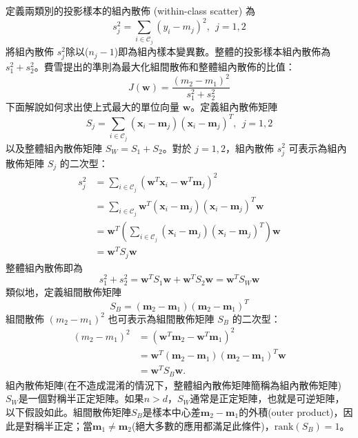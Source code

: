 定義兩類別的投影樣本的組內散佈 (within-class scatter) 為
$$\displaystyle  s_j^2=\sum_{i\in\mathcal{C}_j}(y_i-m_j)^2,~~j=1,2$$
將組內散佈 $s_j^2$除以($n_j-1$)即為組內樣本變異數。整體的投影樣本組內散佈為$s_1^2+s_2^2$。費雪提出的準則為最大化組間散佈和整體組內散佈的比值：
$$\displaystyle  J(\mathbf{w})=\frac{(m_2-m_1)^2}{s_1^2+s_2^2}$$
下面解說如何求出使上式最大的單位向量 $\mathbf{w}$。定義組內散佈矩陣
$$\displaystyle  S_j=\sum_{i\in\mathcal{C}_j}(\mathbf{x}_i-\mathbf{m}_j)(\mathbf{x}_i-\mathbf{m}_j)^T,~~j=1,2$$
以及整體組內散佈矩陣 $S_W=S_1+S_2$。對於 $j=1,2$，組內散佈 $s_j^2$ 可表示為組內散佈矩陣 $S_j$ 的二次型：
$$\displaystyle\begin{aligned}  s_j^2&=\sum_{i\in\mathcal{C}_j}\left(\mathbf{w}^T\mathbf{x}_i-\mathbf{w}^T\mathbf{m}_j\right)^2\\  &=\sum_{i\in\mathcal{C}_j}\mathbf{w}^T(\mathbf{x}_i-\mathbf{m}_j)(\mathbf{x}_i-\mathbf{m}_j)^T\mathbf{w}\\  &=\mathbf{w}^T\left(\sum_{i\in\mathcal{C}_j}(\mathbf{x}_i-\mathbf{m}_j)(\mathbf{x}_i-\mathbf{m}_j)^T\right)\mathbf{w}\\  &=\mathbf{w}^TS_j\mathbf{w}\end{aligned}$$
整體組內散佈即為
$$\displaystyle s_1^2+s_2^2=\mathbf{w}^TS_1\mathbf{w}+\mathbf{w}^TS_2\mathbf{w}=\mathbf{w}^TS_W\mathbf{w}$$
類似地，定義組間散佈矩陣
$$\displaystyle  S_B=(\mathbf{m}_2-\mathbf{m}_1)(\mathbf{m}_2-\mathbf{m}_1)^T$$
組間散佈 $(m_2-m_1)^2$ 也可表示為組間散佈矩陣 $S_B$ 的二次型：
$$\displaystyle\begin{aligned}  (m_2-m_1)^2&=\left(\mathbf{w}^T\mathbf{m}_2-\mathbf{w}^T\mathbf{m}_1\right)^2\\  &=\mathbf{w}^T(\mathbf{m}_2-\mathbf{m}_1)(\mathbf{m}_2-\mathbf{m}_1)^T\mathbf{w}\\  &=\mathbf{w}^TS_B\mathbf{w}.  \end{aligned}$$
組內散佈矩陣(在不造成混淆的情況下，整體組內散佈矩陣簡稱為組內散佈矩陣)$S_W$是一個對稱半正定矩陣。如果$n>d$，$S_W$通常是正定矩陣，也就是可逆矩陣，以下假設如此。組間散佈矩陣$S_B$是樣本中心差$\mathbf{m}_2-\mathbf{m}_1$的外積(outer product)，因此是對稱半正定；當$\mathbf{m}_1\neq\mathbf{m}_2$(絕大多數的應用都滿足此條件)，$\text{rank}(S_B)=1$。

